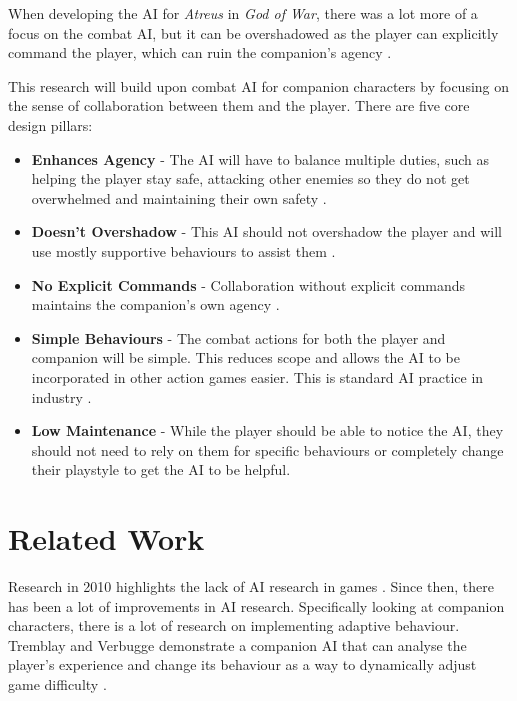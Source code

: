 \documentclass{IEEEtran}
\begin{document}
When developing the AI for \textit{Atreus} in \textit{God of War}, there was a lot more of a focus on the combat AI, but it can be overshadowed as the player can explicitly command the player, which can ruin the companion's agency \cite{EGXCharacterDeathGuildWars}.

This research will build upon combat AI for companion characters by focusing on the sense of collaboration between them and the player. There are five core design pillars:

\label{CoreDesign}
\begin{itemize}
	\item \textbf{Enhances Agency} - The AI will have to balance multiple duties, such as helping the player stay safe, attacking other enemies so they do not get overwhelmed and maintaining their own safety \cite{CoupledEmpowermentMaximisation, tremblay2013adaptive}.
	\item \textbf{Doesn't Overshadow} - This AI should not overshadow the player and will use mostly supportive behaviours to assist them \cite{CoupledEmpowermentMaximisation, DesignDocAIAllies}.
	\item \textbf{No Explicit Commands} - Collaboration without explicit commands maintains the companion's own agency \cite{EGXCharacterDeathGuildWars}.
	\item \textbf{Simple Behaviours} - The combat actions for both the player and companion will be simple. This reduces scope and allows the AI to be incorporated in other action games easier. This is standard AI practice in industry \cite{GMTGoodAI, GDCLessIsMore, GDCSimplestAITrick}.
	\item \textbf{Low Maintenance} - While the player should be able to notice the AI, they should not need to rely on them for specific behaviours or completely change their playstyle to get the AI to be helpful.
\end{itemize}

\section{Related Work}
\label{RelatedWork}

Research in 2010 highlights the lack of AI research in games \cite{RealTimeAICritique2010}. Since then, there has been a lot of improvements in AI research. Specifically looking at companion characters, there is a lot of research on implementing adaptive behaviour. Tremblay and Verbugge demonstrate a companion AI that can analyse the player's experience and change its behaviour as a way to dynamically adjust game difficulty \cite{tremblay2013adaptive}.
\end{document}
